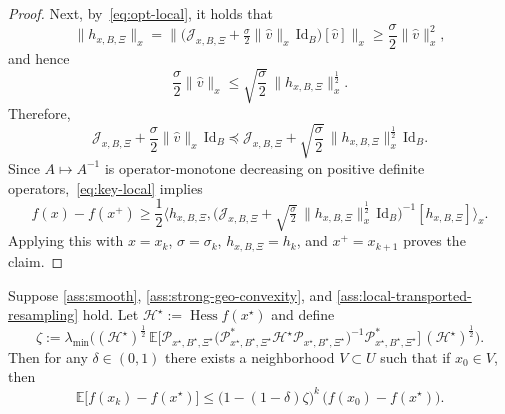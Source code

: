 \documentclass[final,onefignum,onetabnum]{siamart250211}
\newcommand{\Hess}{\operatorname{Hess}}
\begin{document}
\begin{proof}
Next, by~\eqref{eq:opt-local},
it holds that
\[
\|h_{x,B,\Xi}\|_x
=
\big\|
\bigl(\mathcal J_{x,B,\Xi}+\tfrac{\sigma}{2}\|\hat v\|_x\,\mathrm{Id}_B\bigr)[\hat v]
\big\|_x
\ge
\frac{\sigma}{2}\|\hat v\|_x^2,
\]
and hence
\[
\frac{\sigma}{2}\|\hat v\|_x
\le
\sqrt{\frac{\sigma}{2}}\,\|h_{x,B,\Xi}\|_x^{\frac{1}{2}}.
\]
Therefore,
\[
\mathcal J_{x,B,\Xi}+\frac{\sigma}{2}\|\hat v\|_x\,\mathrm{Id}_B
\preceq
\mathcal J_{x,B,\Xi}+\sqrt{\frac{\sigma}{2}}\,\|h_{x,B,\Xi}\|_x^{\frac{1}{2}}\,\mathrm{Id}_B.
\]
Since $A\mapsto A^{-1}$ is operator-monotone decreasing on positive definite operators,~\eqref{eq:key-local} implies
\[
f(x)-f(x^+)
\ge
\frac{1}{2}
\Big\langle
h_{x,B,\Xi},
\bigl(\mathcal J_{x,B,\Xi}+\sqrt{\tfrac{\sigma}{2}}\,\|h_{x,B,\Xi}\|_x^{\frac{1}{2}}\,\mathrm{Id}_B\bigr)^{-1}[h_{x,B,\Xi}]
\Big\rangle_x.
\]
Applying this with $x=x_k$, $\sigma=\sigma_k$, $h_{x,B,\Xi}=h_k$, and $x^+=x_{k+1}$ proves the claim.
\end{proof}

\begin{theorem}
\label{thm:riem-local-exp}
Suppose \cref{ass:smooth}, \cref{ass:strong-geo-convexity}, and \cref{ass:local-transported-resampling} hold. Let $\mathcal{H}^\star:=\Hess f(x^\star)$ and define
\[
\zeta
:=
\lambda_{\min}\!\Big(
(\mathcal{H}^\star)^{\frac{1}{2}}\,
\mathbb E\big[
\mathcal P_{x^\star,B^\star,\Xi^\star}
\bigl(\mathcal P_{x^\star,B^\star,\Xi^\star}^{*}\mathcal{H}^\star\mathcal P_{x^\star,B^\star,\Xi^\star}\bigr)^{-1}
\mathcal P_{x^\star,B^\star,\Xi^\star}^{*}
\big]\,
(\mathcal{H}^\star)^{\frac{1}{2}}
\Big).
\]
Then for any $\delta\in(0,1)$ there exists a neighborhood $V\subset U$ such that if $x_0\in V$, then
\[
\mathbb E\bigl[f(x_k)-f(x^\star)\bigr]
\le
\bigl(1-(1-\delta)\zeta\bigr)^k\,\bigl(f(x_0)-f(x^\star)\bigr).
\]
\end{theorem}
\end{document}
